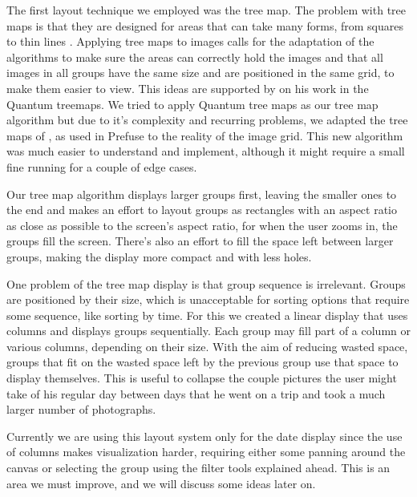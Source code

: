 The first layout technique we employed was the tree map. The problem with tree maps is that they are designed for areas that can take many forms, from squares to thin lines . Applying tree maps to images calls for the adaptation of the algorithms to make sure the areas can correctly hold the images and that all images in all groups have the same size and are positioned in the same grid, to make them easier to view. This ideas are supported by  on his work in the Quantum treemaps. We tried to apply Quantum tree maps as our tree map algorithm but due to it's complexity and recurring problems, we adapted the tree maps of , as used in Prefuse   to the reality of the image grid. This new algorithm was much easier to understand and implement, although  it might require a small fine running for a couple of edge cases.

Our tree map algorithm displays larger groups first, leaving the smaller ones to the end and makes an effort to layout groups as rectangles with an aspect ratio as close as possible to the screen's aspect ratio, for when the user zooms in, the groups fill the screen. There's also an effort to fill the space left between larger groups, making the display more compact and with less holes.

One problem of the tree map display is that group sequence is irrelevant. Groups are positioned by their size, which is unacceptable for sorting options that require some sequence, like sorting by time. For this we created a linear display that uses columns and displays groups sequentially. Each group may fill part of a column or various columns, depending on their size. With the aim of reducing wasted space, groups that fit on the wasted space left by the previous group use that space to display themselves. This is useful  to collapse the couple pictures the user might take of his regular day between days that he went on a trip and took a much larger number of photographs.

Currently we are using this layout system only for the date display since the use of columns makes visualization harder, requiring either some panning around the canvas or selecting the group using the filter tools explained ahead. This is an area we must improve, and we will discuss some ideas later on.




